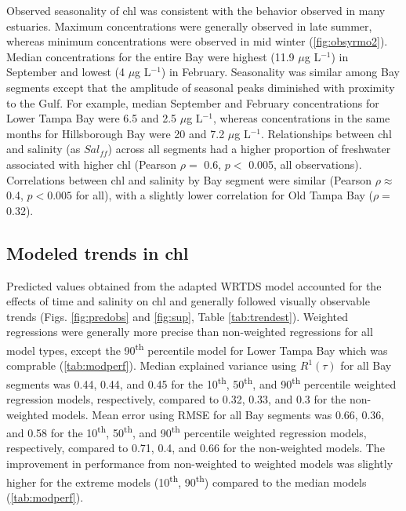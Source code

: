 \documentclass{svjour3}\usepackage[]{graphicx}\usepackage[]{color}
\newcommand{\mugl}{$\mu$g L$^{-1}$}
\newcommand{\nine}{90\textsuperscript{th} percentile }
\begin{document}
Observed seasonality of \ac{chl} was consistent with the behavior observed in many estuaries.  Maximum concentrations were generally observed in late summer, whereas minimum concentrations were observed in mid winter (\cref{fig:obsyrmo2}).  Median concentrations for the entire Bay were highest (11.9 \mugl) in September and lowest (4 \mugl) in February.  Seasonality was similar among Bay segments except that the amplitude of seasonal peaks diminished with proximity to the Gulf.  For example, median September and February concentrations for Lower Tampa Bay were 6.5 and 2.5 \mugl, whereas concentrations in the same months for Hillsborough Bay were 20 and 7.2 \mugl.  Relationships between \ac{chl} and salinity (as $Sal_{ff}$) across all segments had a higher proportion of freshwater associated with higher \ac{chl} (Pearson $\rho=$ 0.6, $p<$ 0.005, all observations).  Correlations between \ac{chl} and salinity by Bay segment were similar (Pearson $\rho \approx$ 0.4, $p<0.005$ for all), with a slightly lower correlation for Old Tampa Bay ($\rho=$ 0.32).

\subsection{Modeled trends in \acl{chl}}

Predicted values obtained from the adapted \ac{WRTDS} model accounted for the effects of time and salinity on \ac{chl} and generally followed visually observable trends (Figs. \ref{fig:predobs} and \ref{fig:sup}, Table \ref{tab:trendest}).  Weighted regressions were generally more precise than non-weighted regressions for all model types, except the \nine model for Lower Tampa Bay which was comprable (\cref{tab:modperf}). Median explained variance using $R^1\left(\tau\right)$ for all Bay segments was 0.44, 0.44, and 0.45 for the 10\textsuperscript{th}, 50\textsuperscript{th}, and 90\textsuperscript{th} percentile weighted regression models, respectively, compared to 0.32, 0.33, and 0.3 for the non-weighted models.  Mean error using \ac{RMSE} for all Bay segments was 0.66, 0.36, and 0.58 for the 10\textsuperscript{th}, 50\textsuperscript{th}, and 90\textsuperscript{th} percentile weighted regression models, respectively, compared to 0.71, 0.4, and 0.66 for the non-weighted models.  The improvement in performance from non-weighted to weighted models was slightly higher for the extreme models (10\textsuperscript{th}, 90\textsuperscript{th}) compared to the median models (\cref{tab:modperf}).    
\end{document}
